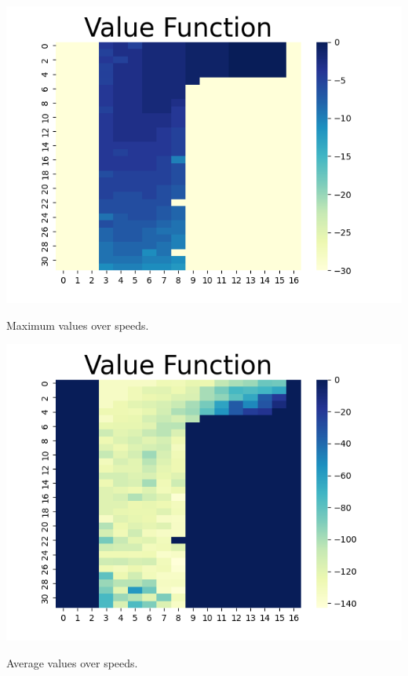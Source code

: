 \documentclass[11pt]{article}
\begin{document}
    \includegraphics[scale=0.7]{env2_5_3_1_max}

    Maximum values over speeds.

    \includegraphics[scale=0.7]{env2_5_3_1_avg}

    Average values over speeds.
\end{document}
